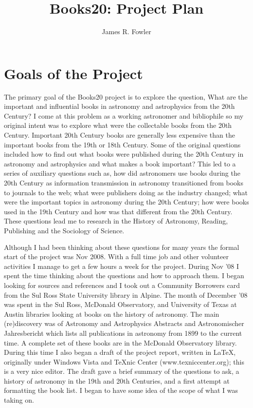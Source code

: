 \documentclass{article}
\begin{document}
\title{Books20: Project Plan}
\author{James R. Fowler}
\maketitle
\vfil\eject

\vspace*{5 in}

\vfil\eject

%
%
\section{Goals of the Project}
The primary goal of the Books20 project is to explore the question,
What are the important and influential books in astronomy and
astrophysics from the 20th Century? I come at this problem as a
working astronomer and bibliophile so my original intent was to
explore what were the collectable books from the 20th
Century. Important 20th Century books are generally less expensive
than the important books from the 19th or 18th Century.  Some of the
original questions included how to find out what books were published
during the 20th Century in astronomy and astrophysics and what makes a
book important? This led to a series of auxiliary questions such as,
how did astronomers use books during the 20th Century as information
transmission in astronomy transitioned from books to journals to the
web; what were publishers doing as the industry changed; what were the
important topics in astronomy during the 20th Century; how were books
used in the 19th Century and how was that different from the 20th
Century.  These questions lead me to research in the History of
Astronomy, Reading, Publishing and the Sociology of Science.

Although I had been thinking about these questions for many years the
formal start of the project was Nov 2008. With a full time job and
other volunteer activities I manage to get a few hours a week for the
project. During Nov '08 I spent the time thinking about the questions
and how to approach them.  I began looking for sources and references
and I took out a Community Borrowers card from the Sul Ross State
University library in Alpine.  The month of December '08 was spent in
the Sul Ross, McDonald Observatory, and University of Texas at Austin
libraries looking at books on the history of astronomy. The main
(re)discovery was of Astronomy and Astrophysics Abstracts and
Astronomischer Jahresbericht which lists all publications in astronomy
from 1899 to the current time. A complete set of these books are in
the McDonald Observatory library. During this time I also began a
draft of the project report, written in LaTeX, originally under
Windows Vista and TeXnic Center (www.texniccenter.org); this is a very
nice editor.  The draft gave a brief summary of the questions to ask,
a history of astronomy in the 19th and 20th Centuries, and a first
attempt at formatting the book list.  I began to have some idea of the
scope of what I was taking on.
\end{document}
